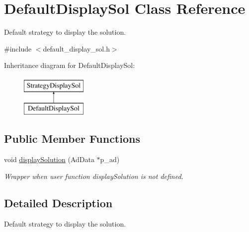 \hypertarget{classDefaultDisplaySol}{\section{\-Default\-Display\-Sol \-Class \-Reference}
\label{classDefaultDisplaySol}
}


\-Default strategy to display the solution.  




{\ttfamily \#include $<$default\-\_\-display\-\_\-sol.\-h$>$}

\-Inheritance diagram for \-Default\-Display\-Sol\-:\begin{figure}[H]
\begin{center}
\leavevmode
\includegraphics[height=2.000000cm]{classDefaultDisplaySol}
\end{center}
\end{figure}
\subsection*{\-Public \-Member \-Functions}
\begin{DoxyCompactItemize}
\item 
void \hyperlink{classDefaultDisplaySol_ab80dde5db4b38e88dba892c5cf94c777}{display\-Solution} (\-Ad\-Data $\ast$p\-\_\-ad)
\begin{DoxyCompactList}\small\item\em \-Wrapper when user function display\-Solution is not defined. \end{DoxyCompactList}\end{DoxyCompactItemize}


\subsection{\-Detailed \-Description}
\-Default strategy to display the solution. 

